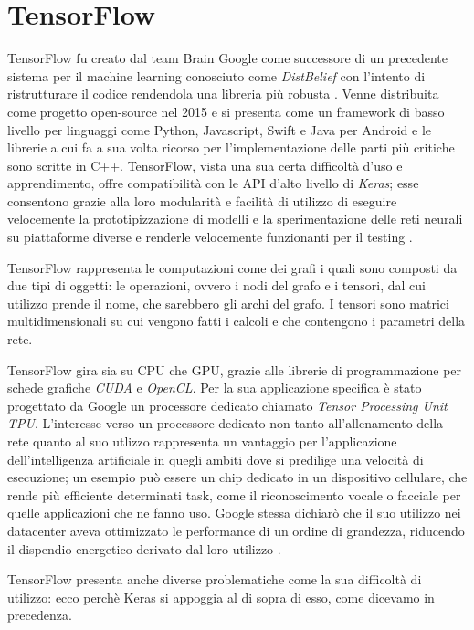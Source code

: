\section{TensorFlow}
TensorFlow  fu creato dal team Brain Google come successore di un precedente sistema per il machine learning conosciuto come \textit{DistBelief} con l'intento di ristrutturare il codice rendendola una libreria più robusta \cite{wiki:tf}. Venne distribuita come progetto open-source nel 2015 e si presenta come un framework di basso livello \cite{oreilly:pytorch_intro} per linguaggi come Python, Javascript, Swift e Java per Android  e le librerie a cui fa a sua volta ricorso per l'implementazione delle parti più critiche sono scritte in C++. TensorFlow, vista una sua certa difficoltà d'uso e apprendimento, offre compatibilità con le API d'alto livello di \textit{Keras}; esse consentono grazie alla loro modularità e facilità di utilizzo di eseguire velocemente la prototipizzazione di modelli e la sperimentazione delle reti neurali su piattaforme diverse e renderle velocemente funzionanti per il testing \cite{keras}.

TensorFlow rappresenta le computazioni come dei grafi i quali sono composti da due tipi di oggetti: le operazioni, ovvero i nodi del grafo e i tensori, dal cui utilizzo prende il nome, che sarebbero gli archi del grafo.
I tensori sono matrici multidimensionali su cui vengono fatti i calcoli e che contengono i parametri della rete.

TensorFlow gira sia su CPU che GPU, grazie alle librerie di programmazione per schede grafiche \textit{CUDA} e \textit{OpenCL}. Per la sua applicazione specifica è stato progettato da Google un processore dedicato chiamato \emph{Tensor Processing Unit} \textit{TPU}. L'interesse verso un processore dedicato non tanto all'allenamento della rete quanto al suo utlizzo rappresenta un vantaggio per l'applicazione dell'intelligenza artificiale in quegli ambiti dove si predilige una velocità di esecuzione; un esempio può essere un chip dedicato in un dispositivo cellulare, che rende più efficiente determinati task, come il riconoscimento vocale o facciale per quelle applicazioni che ne fanno uso. Google stessa dichiarò che il suo utilizzo nei datacenter aveva ottimizzato le performance di un ordine di grandezza, riducendo il dispendio energetico derivato dal loro utilizzo \cite{gao2014machine}. 

TensorFlow presenta anche diverse problematiche come la sua difficoltà di utilizzo: ecco perchè Keras si appoggia al di sopra di esso, come dicevamo in precedenza.


